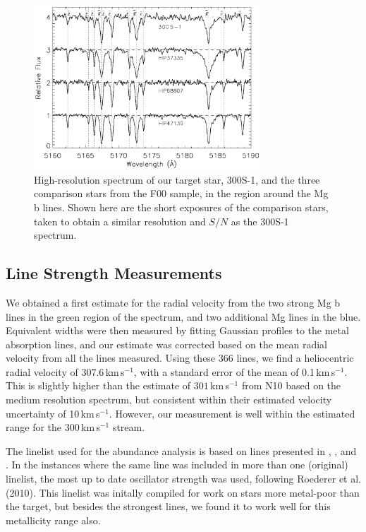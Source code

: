 \documentclass{emulateapj}
\begin{document}
\begin{figure}
 \begin{center}
  \includegraphics[clip=true,width=8.5cm,bbllx=55, bblly=12,
   bburx=510, bbury=370]{Mgspecs_fixed.eps}
  \caption{High-resolution spectrum of our target star, 300S-1, and
    the three comparison stars from the F00 sample, in the region
    around the Mg b lines. Shown here are the short exposures of the
    comparison stars, taken to obtain a similar resolution and $S/N$ as
    the 300S-1 spectrum.}
  \label{fig:mglines}
 \end{center}
\end{figure}



\subsection{Line Strength Measurements}
\label{sec:linemes}
We obtained a first estimate for the radial velocity from the two
strong Mg b lines in the green region of the spectrum, and two
additional Mg lines in the blue. Equivalent widths were then measured
by fitting Gaussian profiles to the metal absorption lines, and our
estimate was corrected based on the mean radial velocity from all the
lines measured. Using these 366 lines, we find a heliocentric radial
velocity of $307.6$\,km\,s$^{-1}$, with a standard error of the mean
of 0.1\,km\,s$^{-1}$. This is slightly higher than the estimate of
$301$\,km\,s$^{-1}$ from N10 based on the medium resolution spectrum,
but consistent within their estimated velocity uncertainty of
10\,km\,s$^{-1}$. However, our measurement is well within the
estimated range for the 300\,km\,s$^{-1}$ stream.

The linelist used for the abundance analysis is based on lines
presented in \citet{Roederer2010}, \citet{Aoki2007b}, and
\citet{Cayrel2004}. In the instances where the same line was included
in more than one (original) linelist, the most up to date oscillator
strength was used, following Roederer et al. (2010).  This linelist
was initally compiled for work on stars more metal-poor than the
target, but besides the strongest lines, we found it to work well for
this metallicity range also.
\end{document}
